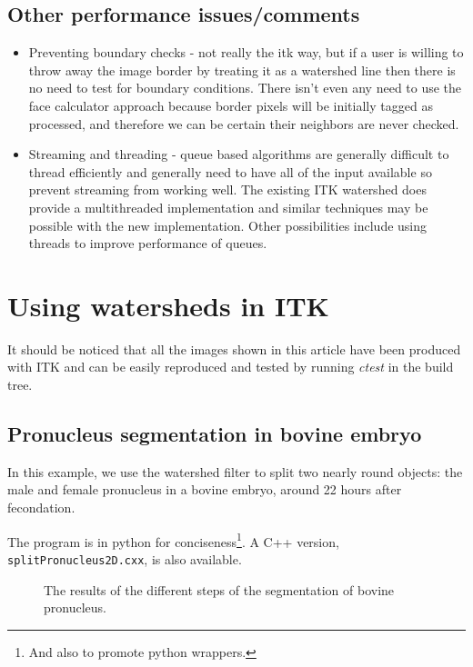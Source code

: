 \documentclass{InsightArticle}
\begin{document}
\subsection{Other performance issues/comments}
\begin{itemize}
\item Preventing boundary checks - not really the itk way, but if a user is
willing to throw away the image border by treating it as a watershed
line then there is no need to test for boundary conditions. There
isn't even any need to use the face calculator approach because border
pixels will be initially tagged as processed, and therefore we can be
certain their neighbors are never checked.
\item Streaming and threading  - queue based algorithms are generally difficult 
to thread efficiently and generally need to have all of the input
available so prevent streaming from working well. The existing ITK
watershed does provide a multithreaded implementation and similar
techniques may be possible with the new implementation. Other
possibilities include using threads to improve performance of queues.
\end{itemize}


\section{Using watersheds in ITK}
\label{sect:using-ws-itk}

It should be noticed that all the images shown in this article have been
produced with ITK and can be easily reproduced and tested by running 
{\em ctest} in the build tree.

\subsection{Pronucleus segmentation in bovine embryo}
\label{sect:pronucleus}
In this example, we use the watershed filter to split two nearly round
objects: the male and female pronucleus in a bovine embryo, around 22
hours after fecondation.

The program is in python for conciseness\footnote{And also to promote
python wrappers.}. A C++ version, \verb$splitPronucleus2D.cxx$, is also
available.

\begin{figure}[htbp]
\begin{center}

\caption{The results of the different steps of the segmentation of bovine pronucleus.}
\end{center}
\end{figure}
\end{document}
